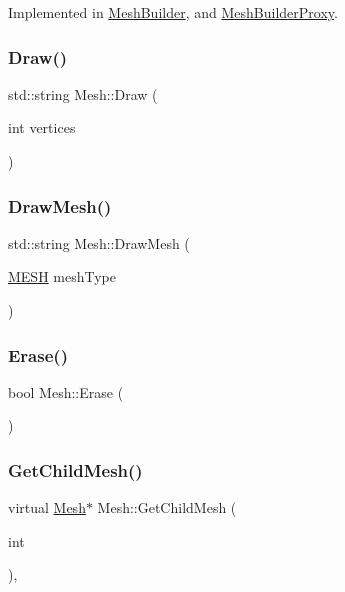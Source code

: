 Implemented in \mbox{\hyperlink{class_mesh_builder_a33b55c406864ac41830dce591fb84ab0}{Mesh\+Builder}}, and \mbox{\hyperlink{class_mesh_builder_proxy_aeef3c361967a22015c6bd314e3b473e7}{Mesh\+Builder\+Proxy}}.

\mbox{\label{class_mesh_a4c2c032325385def999caf43e2ef88fd}} 
\subsubsection{\texorpdfstring{Draw()}{Draw()}}
{\footnotesize\ttfamily std\+::string Mesh\+::\+Draw (\begin{DoxyParamCaption}\item[{int}]{vertices }\end{DoxyParamCaption})}

\mbox{\label{class_mesh_a93f132c99c02fa1d48f75c50540acc8d}} 
\subsubsection{\texorpdfstring{DrawMesh()}{DrawMesh()}}
{\footnotesize\ttfamily std\+::string Mesh\+::\+Draw\+Mesh (\begin{DoxyParamCaption}\item[{\mbox{\hyperlink{_p_i_m_p_l_2_p_i_m_p_l_2_commons_8h_a7d8bc2c54c2771e646f020b8420adafc}{M\+E\+SH}}}]{mesh\+Type }\end{DoxyParamCaption})}

\mbox{\label{class_mesh_a865729c3f6d111f09a7c422f102038ae}} 
\subsubsection{\texorpdfstring{Erase()}{Erase()}}
{\footnotesize\ttfamily bool Mesh\+::\+Erase (\begin{DoxyParamCaption}{ }\end{DoxyParamCaption})}

\mbox{\label{class_mesh_a6a97fe50af0e6b5bca76a15f73bbc1c0}} 
\subsubsection{\texorpdfstring{GetChildMesh()}{GetChildMesh()}\hspace{0.1cm}{\footnotesize\ttfamily [1/2]}}
{\footnotesize\ttfamily virtual \mbox{\hyperlink{class_mesh}{Mesh}}$\ast$ Mesh\+::\+Get\+Child\+Mesh (\begin{DoxyParamCaption}\item[{int}]{ }\end{DoxyParamCaption})\hspace{0.3cm}{\ttfamily [inline]}, {\ttfamily [virtual]}}



